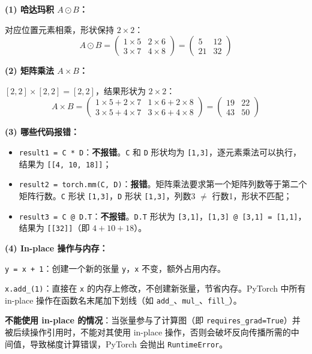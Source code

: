 \documentclass[a4paper,11pt]{ctexart}
\begin{document}
\begin{solutionbox}[参考答案与详细解析]
    \textbf{(1) 哈达玛积 $A \odot B$：}

    对应位置元素相乘，形状保持 $2\times2$：
    \[
    A \odot B = \begin{pmatrix} 1\times5 & 2\times6 \\ 3\times7 & 4\times8 \end{pmatrix}
    = \begin{pmatrix} 5 & 12 \\ 21 & 32 \end{pmatrix}
    \]

    \textbf{(2) 矩阵乘法 $A \times B$：}

    $[2,2] \times [2,2] = [2,2]$，结果形状为 $2\times2$：
    \[
    A \times B = \begin{pmatrix} 1\times5+2\times7 & 1\times6+2\times8 \\ 3\times5+4\times7 & 3\times6+4\times8 \end{pmatrix}
    = \begin{pmatrix} 19 & 22 \\ 43 & 50 \end{pmatrix}
    \]

    \textbf{(3) 哪些代码报错：}

    \begin{itemize}
        \item \texttt{result1 = C * D}：\textbf{不报错}。\texttt{C} 和 \texttt{D} 形状均为 \texttt{[1,3]}，逐元素乘法可以执行，结果为 \texttt{[[4, 10, 18]]}；
        \item \texttt{result2 = torch.mm(C, D)}：\textbf{报错}。矩阵乘法要求第一个矩阵列数等于第二个矩阵行数。\texttt{C} 形状 \texttt{[1,3]}，\texttt{D} 形状 \texttt{[1,3]}，列数3 $\neq$ 行数1，形状不匹配；
        \item \texttt{result3 = C @ D.T}：\textbf{不报错}。\texttt{D.T} 形状为 \texttt{[3,1]}，\texttt{[1,3] @ [3,1] = [1,1]}，结果为 \texttt{[[32]]}（即 $4+10+18$）。
    \end{itemize}

    \textbf{(4) In-place 操作与内存：}

    \texttt{y = x + 1}：创建一个新的张量 \texttt{y}，\texttt{x} 不变，额外占用内存。

    \texttt{x.add\_(1)}：直接在 \texttt{x} 的内存上修改，不创建新张量，节省内存。PyTorch 中所有 in-place 操作在函数名末尾加下划线（如 \texttt{add\_}、\texttt{mul\_}、\texttt{fill\_}）。

    \textbf{不能使用 in-place 的情况}：当张量参与了计算图（即 \texttt{requires\_grad=True}）并被后续操作引用时，不能对其使用 in-place 操作，否则会破坏反向传播所需的中间值，导致梯度计算错误，PyTorch 会抛出 \texttt{RuntimeError}。
\end{solutionbox}
\end{document}
